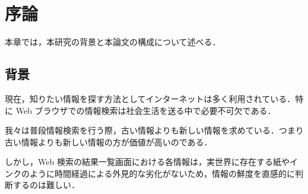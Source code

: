 \chapter{序論}
\label{chap:introduction}

本章では，本研究の背景と本論文の構成について述べる．

\newpage

\section{背景}

現在，知りたい情報を探す方法としてインターネットは多く利用されている．特に Web ブラウザでの情報検索は社会生活を送る中で必要不可欠である．

我々は普段情報検索を行う際，古い情報よりも新しい情報を求めている．つまり古い情報よりも新しい情報の方が価値が高いのである．

しかし，Web 検索の結果一覧画面における各情報は，実世界に存在する紙やインクのように時間経過による外見的な劣化がないため，情報の鮮度を直感的に判断するのは難しい．

